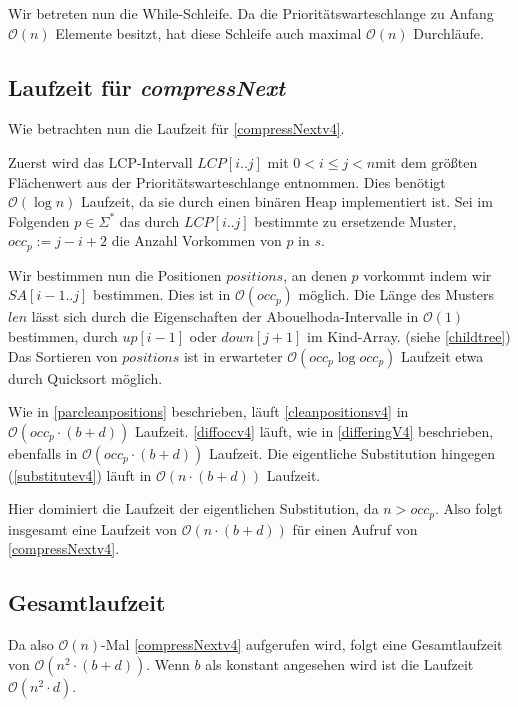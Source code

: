Wir betreten nun die While-Schleife. Da die Prioritätswarteschlange zu Anfang $\mathcal{O}(n)$ Elemente besitzt, hat diese Schleife auch maximal $\mathcal{O}(n)$ Durchläufe.

\subsection{Laufzeit für \emph{compressNext}}

Wie betrachten nun die Laufzeit für \autoref{compressNextv4}.

Zuerst wird das LCP-Intervall $LCP[i..j]$ mit $0 < i \leq j < n$mit dem größten Flächenwert aus der Prioritätswarteschlange entnommen. Dies benötigt $\mathcal{O}(\log n)$ Laufzeit, da sie durch einen binären Heap implementiert ist.
Sei im Folgenden $p \in \Sigma^*$ das durch $LCP[i..j]$ bestimmte zu ersetzende Muster, $occ_p := j - i + 2$ die Anzahl Vorkommen von $p$ in $s$.  

Wir bestimmen nun die Positionen $positions$, an denen $p$ vorkommt indem wir $SA[i-1..j]$ bestimmen. Dies ist in $\mathcal{O}(occ_p)$ möglich.
Die Länge des Musters $len$ lässt sich durch die Eigenschaften der Abouelhoda-Intervalle in $\mathcal{O}(1)$ bestimmen, durch $up[i-1]$ oder $down[j+1]$ im Kind-Array. (siehe \autoref{childtree})
Das Sortieren von $positions$ ist in erwarteter $\mathcal{O}(occ_p \log occ_p)$ Laufzeit etwa durch Quicksort möglich.

Wie in \autoref{parcleanpositions} beschrieben, läuft \autoref{cleanpositionsv4} in $\mathcal{O}(occ_p \cdot (b + d))$ Laufzeit.
\autoref{diffoccv4} läuft, wie in \autoref{differingV4} beschrieben, ebenfalls in $\mathcal{O}(occ_p \cdot (b + d))$ Laufzeit.
Die eigentliche Substitution hingegen (\autoref{substitutev4}) läuft in $\mathcal{O}(n \cdot (b + d))$ Laufzeit.

Hier dominiert die Laufzeit der eigentlichen Substitution, da $n > occ_p$.
Also folgt insgesamt eine Laufzeit von $\mathcal{O}(n \cdot (b + d))$ für einen Aufruf von \autoref{compressNextv4}.

\subsection{Gesamtlaufzeit}

Da also $\mathcal{O}(n)$-Mal \autoref{compressNextv4} aufgerufen wird, folgt eine Gesamtlaufzeit von $\mathcal{O}(n^2 \cdot (b + d))$. Wenn $b$ als konstant angesehen wird ist die Laufzeit $\mathcal{O}(n^2 \cdot d)$.


